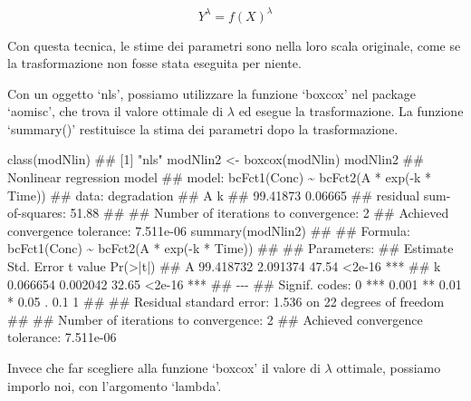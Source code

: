 \documentclass[a4paper,12pt,oneside]{book}
\newenvironment{Shaded}{\begin{snugshade}}{\end{snugshade}}
\newcommand{\DocumentationTok}[1]{#1}
\newcommand{\OtherTok}[1]{#1}
\newcommand{\FunctionTok}[1]{#1}
\newcommand{\NormalTok}[1]{#1}
\begin{document}
\[Y^\lambda  = f(X)^\lambda\]

Con questa tecnica, le stime dei parametri sono nella loro scala originale, come se la trasformazione non fosse stata eseguita per niente.

Con un oggetto `nls', possiamo utilizzare la funzione `boxcox' nel package `aomisc', che trova il valore ottimale di \(\lambda\) ed esegue la trasformazione. La funzione `summary()' restituisce la stima dei parametri dopo la trasformazione.

\begin{Shaded}
\begin{Highlighting}[]
\FunctionTok{class}\NormalTok{(modNlin)}
\DocumentationTok{\#\# [1] "nls"}
\NormalTok{modNlin2 }\OtherTok{\textless{}{-}} \FunctionTok{boxcox}\NormalTok{(modNlin)}
\NormalTok{modNlin2}
\DocumentationTok{\#\# Nonlinear regression model}
\DocumentationTok{\#\#   model: bcFct1(Conc) \textasciitilde{} bcFct2(A * exp({-}k * Time))}
\DocumentationTok{\#\#    data: degradation}
\DocumentationTok{\#\#        A        k }
\DocumentationTok{\#\# 99.41873  0.06665 }
\DocumentationTok{\#\#  residual sum{-}of{-}squares: 51.88}
\DocumentationTok{\#\# }
\DocumentationTok{\#\# Number of iterations to convergence: 2 }
\DocumentationTok{\#\# Achieved convergence tolerance: 7.511e{-}06}
\FunctionTok{summary}\NormalTok{(modNlin2)}
\DocumentationTok{\#\# }
\DocumentationTok{\#\# Formula: bcFct1(Conc) \textasciitilde{} bcFct2(A * exp({-}k * Time))}
\DocumentationTok{\#\# }
\DocumentationTok{\#\# Parameters:}
\DocumentationTok{\#\#    Estimate Std. Error t value Pr(\textgreater{}|t|)    }
\DocumentationTok{\#\# A 99.418732   2.091374   47.54   \textless{}2e{-}16 ***}
\DocumentationTok{\#\# k  0.066654   0.002042   32.65   \textless{}2e{-}16 ***}
\DocumentationTok{\#\# {-}{-}{-}}
\DocumentationTok{\#\# Signif. codes:  0 \textquotesingle{}***\textquotesingle{} 0.001 \textquotesingle{}**\textquotesingle{} 0.01 \textquotesingle{}*\textquotesingle{} 0.05 \textquotesingle{}.\textquotesingle{} 0.1 \textquotesingle{} \textquotesingle{} 1}
\DocumentationTok{\#\# }
\DocumentationTok{\#\# Residual standard error: 1.536 on 22 degrees of freedom}
\DocumentationTok{\#\# }
\DocumentationTok{\#\# Number of iterations to convergence: 2 }
\DocumentationTok{\#\# Achieved convergence tolerance: 7.511e{-}06}
\end{Highlighting}
\end{Shaded}

Invece che far scegliere alla funzione `boxcox' il valore di \(\lambda\) ottimale, possiamo imporlo noi, con l'argomento `lambda'.
\end{document}

